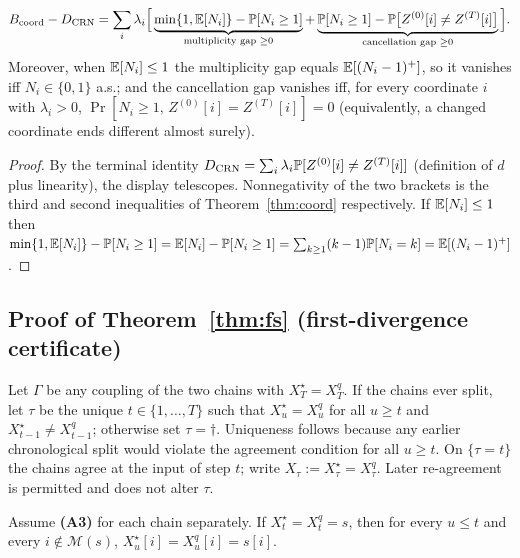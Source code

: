 \label{app:proofs:gap}
\begin{proposition}
\label{prop:G:gap}
\[
B_{\mathrm{coord}}-D_{\mathrm{CRN}}
=\sum_{i}\lambda_{i}\Big[
\underbrace{\min\{1,\mathbb{E}[N_{i}]\}-\mathbb{P}[N_{i}\ge1]}_{\text{multiplicity gap }\ge0}
+\underbrace{\mathbb{P}[N_{i}\ge1]-\mathbb{P}\big[Z^{(0)}[i]\neq Z^{(T)}[i]\big]}_{\text{cancellation gap }\ge0}
\Big].
\]
Moreover, when $\mathbb{E}[N_{i}]\le1$ the multiplicity gap equals $\mathbb{E}[(N_{i}-1)^{+}]$, so it vanishes
iff $N_{i}\in\{0,1\}$ a.s.; and the cancellation gap vanishes iff, for every coordinate
$i$ with $\lambda_i>0$, $\Pr[N_i\ge1,\,Z^{(0)}[i]=Z^{(T)}[i]]=0$ (equivalently, a changed
coordinate ends different almost surely).
\end{proposition}

\begin{proof}
By the terminal identity $D_{\mathrm{CRN}}=\sum_{i}\lambda_{i}\mathbb{P}[Z^{(0)}[i]\neq Z^{(T)}[i]]$ (definition of
$d$ plus linearity), the display telescopes. Nonnegativity of the two brackets is the third and
second inequalities of Theorem~\ref{thm:coord} respectively. If $\mathbb{E}[N_{i}]\le1$ then
$\min\{1,\mathbb{E}[N_{i}]\}-\mathbb{P}[N_{i}\ge1]=\mathbb{E}[N_{i}]-\mathbb{P}[N_{i}\ge1]
=\sum_{k\ge1}(k-1)\mathbb{P}[N_{i}=k]=\mathbb{E}[(N_{i}-1)^{+}]$.
\end{proof}

\subsection{Proof of Theorem~\ref{thm:fs} (first-divergence certificate)}
\label{app:proofs:fs}

\begin{definition}
\label{def:G:tau}
Let $\Gamma$ be any coupling of the two chains with $X^{\star}_{T}=X^{q}_{T}$. If the chains ever
split, let $\tau$ be the unique $t\in\{1,\dots,T\}$ such that
$X^{\star}_{u}=X^{q}_{u}$ for all $u\ge t$ and $X^{\star}_{t-1}\neq X^{q}_{t-1}$; otherwise set
$\tau=\dagger$. Uniqueness follows because any earlier chronological split would violate the
agreement condition for all $u\ge t$. On $\{\tau=t\}$ the chains agree at the input of step $t$;
write $X_{\tau}:=X^{\star}_{\tau}=X^{q}_{\tau}$. Later re-agreement is permitted and does not alter
$\tau$.
\end{definition}

\begin{lemma}
\label{lem:G:frozen}
Assume \textbf{(A3)} for each chain separately. If $X^{\star}_{t}=X^{q}_{t}=s$,
then for every $u\le t$ and every $i\notin\mathcal{M}(s)$,
$X^{\star}_{u}[i]=X^{q}_{u}[i]=s[i]$.
\end{lemma}

